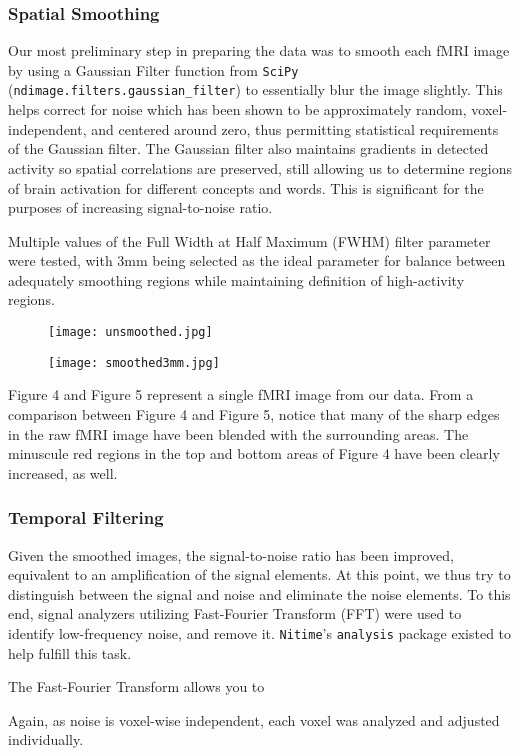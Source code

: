 \subsubsection{Spatial Smoothing}
\par Our most preliminary step in preparing the data was to smooth each fMRI image by using a Gaussian Filter function from \texttt{SciPy}  (\texttt{ndimage.filters.gaussian\_filter}) to essentially blur the image slightly. This helps correct for noise which has been shown to be approximately random, voxel-independent, and centered around zero, thus permitting statistical requirements of the Gaussian filter. The Gaussian filter also maintains gradients in detected activity so spatial correlations are preserved, still allowing us to determine regions of brain activation for different concepts and words. This is significant for the purposes of increasing signal-to-noise ratio.
\par Multiple values of the Full Width at Half Maximum (FWHM) filter parameter were tested, with 3mm being selected as the ideal parameter for balance between adequately smoothing regions while maintaining definition of high-activity regions.

\begin{figure}[H]
\centering
\begin{minipage}{.5\textwidth}
  \centering
  \texttt{[image: unsmoothed.jpg]}
  \label{fig:test1}
\end{minipage}%
\begin{minipage}{.5\textwidth}
  \centering
  \texttt{[image: smoothed3mm.jpg]}
  \label{fig:test2}
\end{minipage}
\end{figure}

\par Figure 4 and Figure 5 represent a single fMRI image from our data. From a comparison between Figure 4 and Figure 5, notice that many of the sharp edges in the raw fMRI image have been blended with the surrounding areas. The minuscule red regions in the top and bottom areas of Figure 4 have been clearly increased, as well.  

\subsubsection{Temporal Filtering}
\par Given the smoothed images, the signal-to-noise ratio has been improved, equivalent to an amplification of the signal elements. At this point, we thus try to distinguish between the signal and noise and eliminate the noise elements. To this end, signal analyzers utilizing Fast-Fourier Transform (FFT) were used to identify low-frequency noise, and remove it. \texttt{Nitime}'s \texttt{analysis} package existed to help fulfill this task. 
\par The Fast-Fourier Transform	allows you to  
\par Again, as noise is voxel-wise independent, each voxel was analyzed and adjusted individually.


